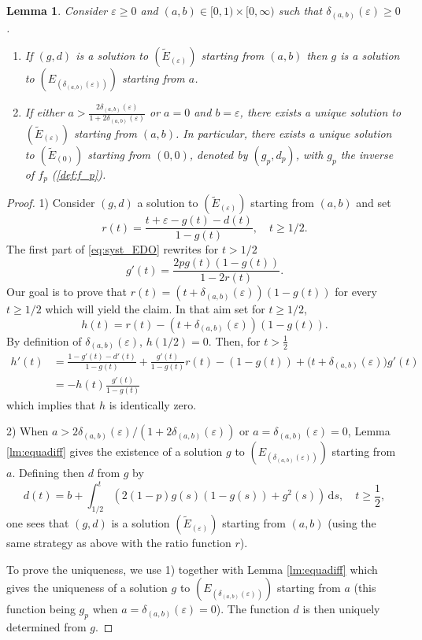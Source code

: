 \documentclass[a4, 11pt]{article}
\numberwithin{equation}{section}
\theoremstyle{plain}
\newtheorem{lemma}[theorem]{Lemma}
\theoremstyle{definition}
\theoremstyle{remark}
\begin{document}
\begin{lemma}
\label{lm:syst_edo}
Consider $\varepsilon\geq0$ and $(a,b)\in [0,1)\times [0,\infty)$ such that $\delta_{(a,b)}(\varepsilon)\geq 0$.
\begin{enumerate}[topsep=0cm]
\item[\emph{1)}] If $(g,d)$ is a solution to $(\tilde{E}_{(\varepsilon)})$ starting from $(a,b)$ then $g$ is a solution to $(E_{(\delta_{(a,b)}(\varepsilon))})$ starting from $a$.
\item[\emph{2)}] If either $a>\frac{2\delta_{(a,b)}(\varepsilon)}{1+2\delta_{(a,b)}(\varepsilon)}$ or $a=0$ and $b=\varepsilon$, there exists a unique solution to $(\tilde{E}_{(\varepsilon)})$ starting from $\left(a,b\right)$. In particular, there exists a unique solution to
$(\tilde{E}_{(0)})$ starting from $(0,0)$, denoted by $(g_p,d_p)$, with $g_p$ the inverse of $f_p$ (\ref{def:f_p}). 
\end{enumerate}
\end{lemma}
\begin{proof}
1) Consider $(g,d)$ a solution to $(\tilde{E}_{(\varepsilon)})$ starting from $(a,b)$ and set
$$
 r(t)=\frac{t+\varepsilon-g(t)-d(t)}{1-g(t)}, \quad t \geq 1/2.
$$
The first part of  \eqref{eq:syst_EDO} rewrites for $t>1/2$
	$$g'(t)=\frac{2pg(t)(1-g(t))}{1-2r(t)}.$$  Our goal is to prove that $r(t)=(t+\delta_{(a,b)}(\varepsilon))(1-g(t))$ for every $t \geq 1/2$ which will yield the claim. In that aim set for $t\geq 1/2$, $$h(t)=r(t)-(t+\delta_{(a,b)}(\varepsilon))(1-g(t)).$$ By definition of $\delta_{(a,b)}(\varepsilon)$, $h\left(1/2\right)=0$. Then, for $t > \frac{1}{2}$
	\begin{align*}
		h'(t)&=\frac{1-g'(t)-d'(t)}{1-g(t)}+\frac{g'(t)}{1-g(t)}r(t)-\left(1-g(t)\right)+\big(t+\delta_{(a,b)}(\varepsilon)\big)g'(t)\\
		&=-h(t)\frac{g'(t)}{1-g(t)}
	\end{align*} 
	which implies that $h$ is identically zero. 
	
2) When $a>2\delta_{(a,b)}(\varepsilon)/(1+2\delta_{(a,b)}(\varepsilon))$ or $a=\delta_{(a,b)}(\varepsilon)=0$, Lemma \ref{lm:equadiff} gives the existence of a solution $g$ to $(E_{(\delta_{(a,b)}(\varepsilon))})$ starting from $a$. Defining then $d$ from $g$ by $$d(t)=b+\int_{1/2}^{t}\left(2(1-p)g(s)\left(1-g(s)\right)+g^2(s)\right)\,\mathrm{d}s, \quad t\geq \frac{1}{2},$$
one sees that $(g,d)$ is a solution $(\tilde{E}_{(\varepsilon)})$ starting from $(a,b)$ (using the same strategy as above with the ratio function $r$).

To prove the uniqueness, we use 1) together with Lemma \ref{lm:equadiff} which gives the uniqueness of a solution $g$ to $(E_{(\delta_{(a,b)}(\varepsilon))})$ starting from $a$ (this function being $g_p$ when $a=\delta_{(a,b)}(\varepsilon)=0$). The function $d$ is then uniquely determined from $g$.
\end{proof}
\end{document}
